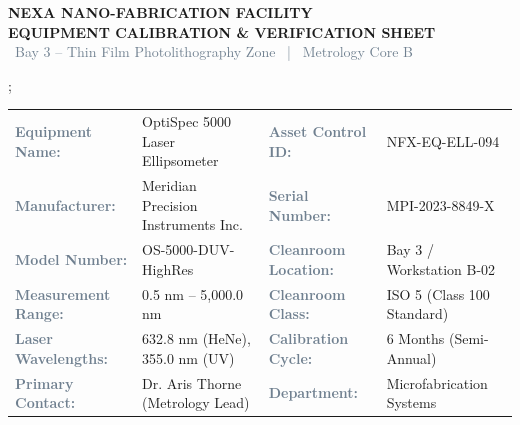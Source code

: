 \documentclass[10pt,a4paper]{scrartcl}
\newcommand{\fieldlabel}[1]{\textcolor{SlateGrey}{\small\bfseries #1}}
\newcommand{\fieldval}[1]{{\small #1}}
\begin{document}
\begin{tcolorbox}[headerbox]
\begin{minipage}[c]{0.68\textwidth}
  {\Large \textbf{\textcolor{NavyDark}{NEXA NANO-FABRICATION FACILITY}}}\\[2pt]
  {\large \textbf{\textcolor{CleanroomBlue}{EQUIPMENT CALIBRATION \& VERIFICATION SHEET}}}\\[3pt]
  {\small \textcolor{SlateGrey}{\faMapMarker\ Bay 3 -- Thin Film Photolithography Zone ~|~ Metrology Core B}}
\end{minipage}%
\begin{minipage}[c]{0.32\textwidth}
  \centering
  \begin{tikz}
    ;
  \end{tikz}
\end{minipage}
\end{tcolorbox}

\vspace{1pt}

\begin{tcolorbox}[sectionbox, title={\faMicroscope\ SECTION 1: EQUIPMENT IDENTIFICATION \& SPECIFICATIONS}]
\small
\begin{tabularx}{\textwidth}{@{}l X l X@{}}
  \fieldlabel{Equipment Name:} & \fieldval{OptiSpec 5000 Laser Ellipsometer} & \fieldlabel{Asset Control ID:} & \fieldval{NFX-EQ-ELL-094} \\
  \fieldlabel{Manufacturer:} & \fieldval{Meridian Precision Instruments Inc.} & \fieldlabel{Serial Number:} & \fieldval{MPI-2023-8849-X} \\
  \fieldlabel{Model Number:} & \fieldval{OS-5000-DUV-HighRes} & \fieldlabel{Cleanroom Location:} & \fieldval{Bay 3 / Workstation B-02} \\
  \fieldlabel{Measurement Range:} & \fieldval{0.5 nm -- 5,000.0 nm} & \fieldlabel{Cleanroom Class:} & \fieldval{ISO 5 (Class 100 Standard)} \\
  \fieldlabel{Laser Wavelengths:} & \fieldval{632.8 nm (HeNe), 355.0 nm (UV)} & \fieldlabel{Calibration Cycle:} & \fieldval{6 Months (Semi-Annual)} \\
  \fieldlabel{Primary Contact:} & \fieldval{Dr. Aris Thorne (Metrology Lead)} & \fieldlabel{Department:} & \fieldval{Microfabrication Systems} \\
\end{tabularx}
\end{tcolorbox}
\end{document}
